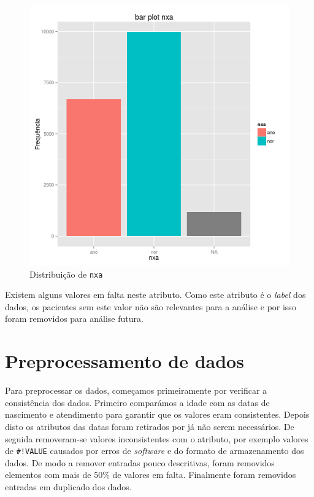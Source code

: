 \documentclass[10pt, conference, compsocconf]{IEEEtran}
\begin{document}
\begin{figure}[H]
  \centering
  \includegraphics[scale=0.4]{img/pre_nxa.png}
  \caption{Distribuição de {\tt nxa}}
  \label{fig:prenxa}
\end{figure}

Existem alguns valores em falta neste atributo. Como este atributo é o
\textit{label} dos dados, os pacientes sem este valor não são
relevantes para a análise e por isso foram removidos para análise
futura.


\section{Preprocessamento de dados}
\label{sec:pre}

Para preprocessar os dados, começamos primeiramente por verificar a
consistência dos dados. Primeiro comparámos a idade com as datas de
nascimento e atendimento para garantir que os valores eram
consistentes. Depois disto os atributos das datas foram retirados por
já não serem necessários. De seguida removeram-se valores
inconsistentes com o atributo, por exemplo valores de {\tt \#!VALUE}
causados por erros de \textit{software} e do formato de armazenamento
dos dados. De modo a remover entradas pouco descritivas, foram
removidos elementos com mais de $50\%$ de valores em falta. Finalmente
foram removidos entradas em duplicado dos dados.
\end{document}
